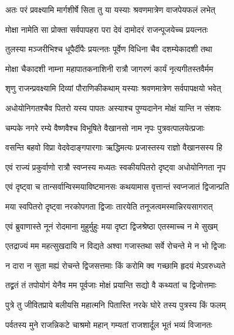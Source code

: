 \twolineshloka
{अतः परं प्रवक्ष्यामि मार्गशीर्षे सिता तु या}
{यस्याः श्रवणमात्रेण वाजपेयफलं लभेत्}%

\twolineshloka
{मोक्षा नामेति सा प्रोक्ता सर्वपापहरा परा}
{देवं दामोदरं राजन्पूजयेच्च प्रयत्नतः}%

\twolineshloka
{तुलस्या मञ्जरीभिश्च धूपैर्दीपैः प्रयत्नतः}
{पूर्वेण विधिना चैव दशम्येकादशी तथा}%

\twolineshloka
{मोक्षा चैकादशी नाम्ना महापातकनाशिनी}
{रात्रौ जागरणं कार्यं नृत्यगीतस्तवैर्मम}%

\twolineshloka
{शृणु राजन्प्रवक्ष्यामि दिव्यां पौराणिकीकथाम्}
{यस्याः श्रवणमात्रेण सर्वपापक्षयो भवेत्}%

\twolineshloka
{अधोयोनिगतश्चैव पितरो यस्य पापतः}
{अस्याश्च पुण्यदानेन मोक्षं यान्ति न संशयः}%

\twolineshloka
{चम्पके नगरे रम्ये वैष्णवैश्च विभूषिते}
{वैखानसो नाम नृपः पुत्रवत्पालयेत्प्रजाः}%

\twolineshloka
{वसन्ति बहवो विप्रा वेदवेदाङ्गपारगाः}
{ऋद्धिमत्यः प्रजास्तस्य राज्ञो वैखानसस्य हि}%

\twolineshloka
{एवं राज्यं प्रकुर्वाणो रात्रौ स्वप्नस्य मध्यतः}
{स्वकीयपितरो दृष्ट्वा अधोयोनिगता नृप}%

\twolineshloka
{एवं दृष्ट्वा च तान्सर्वान्विस्मयाविष्टमानसः}
{कथयामास वृत्तान्तं स्वप्नजातं द्विजान्प्रति}%


\twolineshloka
{मया स्वपितरो दृष्ट्वा नरकोपगता द्विजाः}
{तारयेति तनूजत्वमस्मान्निरयसागरात्}%

\twolineshloka
{एवं ब्रुवाणास्ते नूनं रोदमाना मुहुर्मुहुः}
{मया दृष्टा द्विजश्रेष्ठा एतस्माच्च न मे सुखम्}%

\twolineshloka
{एतद्राज्यं मम महत्सुखदायि न विद्यते}
{अश्वा गजास्तथा सर्वे रोचन्ते मे न भो द्विजाः}%

\twolineshloka
{न दारा न सुता मह्यं रोचन्ते द्विजसत्तमाः}
{किं करोमि क्व गच्छामि हृदयं मेऽवरुध्यते}%

\twolineshloka
{तद्व्रतं तं तपोयोगं येनैव मम पूर्वजाः}
{मोक्षं प्रयान्ति सद्यो वै कथ्यतां च द्विजोत्तमाः}%

\twolineshloka
{पुत्रे तु जीवितप्राये बलीयसि महात्मनि}
{पितास्ति नरके घोरे तस्य पुत्रस्य किं फलम्}%


\twolineshloka
{पर्वतस्य मुने राजन्निकटे चाश्रमो महान्}
{गम्यतां राजशार्दूल भूतं भव्यं विजानतः}%

